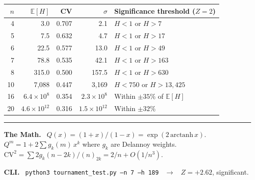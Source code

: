 \documentclass[10pt]{article}
\begin{document}
\begin{center}
\begin{tabular}{@{}rrrrl@{}}
\toprule
$n$ & $\mathbb{E}[H]$ & CV & $\sigma$ & Significance threshold ($Z{=}2$) \\
\midrule
4 & 3.0 & 0.707 & 2.1 & $H < 1$ or $H > 7$ \\
5 & 7.5 & 0.632 & 4.7 & $H < 1$ or $H > 17$ \\
6 & 22.5 & 0.577 & 13.0 & $H < 1$ or $H > 49$ \\
7 & 78.8 & 0.535 & 42.1 & $H < 1$ or $H > 163$ \\
8 & 315.0 & 0.500 & 157.5 & $H < 1$ or $H > 630$ \\
10 & 7,088 & 0.447 & 3,169 & $H < 750$ or $H > 13,425$ \\
16 & $6.4 \times 10^8$ & 0.354 & $2.3 \times 10^8$ & Within $\pm 35\%$ of $\mathbb{E}[H]$ \\
20 & $4.6 \times 10^{12}$ & 0.316 & $1.5 \times 10^{12}$ & Within $\pm 32\%$ \\
\bottomrule
\end{tabular}
\end{center}

\medskip\hrule\medskip

\textbf{The Math.} \ $Q(x) = (1{+}x)/(1{-}x) = \exp(2\,\mathrm{arctanh}\,x)$. \ $Q^m = 1 + 2\sum g_k(m)\,x^k$ where $g_k$ are Delannoy weights. \ $\mathrm{CV}^2 = \sum 2g_k(n{-}2k)/(n)_{2k} = 2/n + O(1/n^3)$.

\medskip
\textbf{CLI.} \ \texttt{python3 tournament\_test.py --n 7 --h 189} \ $\to$ \ $Z = +2.62$, significant.
\end{document}
